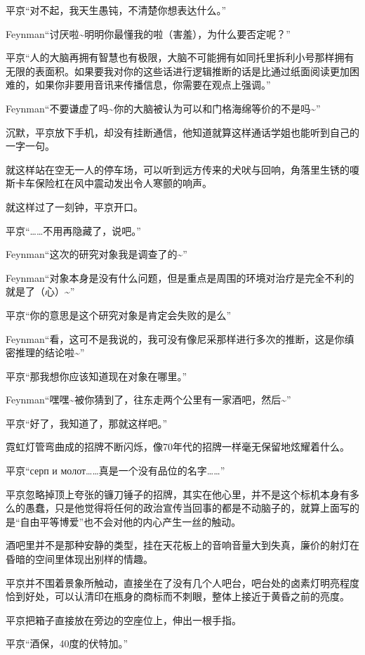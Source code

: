 \documentclass{article}
\begin{document}
平京“对不起，我天生愚钝，不清楚你想表达什么。”

Feynman“讨厌啦\textasciitilde 明明你最懂我的啦（害羞），为什么要否定呢？”

平京“人的大脑再拥有智慧也有极限，大脑不可能拥有如同托里拆利小号那样拥有无限的表面积。如果要我对你的这些话进行逻辑推断的话是比通过纸面阅读更加困难的，如果你非要用音讯来传播信息，你需要在观点上强调。”

Feynman“不要谦虚了吗\textasciitilde 你的大脑被认为可以和门格海绵等价的不是吗\textasciitilde ”

沉默，平京放下手机，却没有挂断通信，他知道就算这样通话学姐也能听到自己的一字一句。

就这样站在空无一人的停车场，可以听到远方传来的犬吠与回响，角落里生锈的嗄斯卡车保险杠在风中震动发出令人寒颤的响声。

就这样过了一刻钟，平京开口。

平京“……不用再隐藏了，说吧。”

Feynman“这次的研究对象我是调查了的\textasciitilde ”

Feynman“对象本身是没有什么问题，但是重点是周围的环境对治疗是完全不利的就是了（心）\textasciitilde ”

平京“你的意思是这个研究对象是肯定会失败的是么”

Feynman“看，这可不是我说的，我可没有像尼采那样进行多次的推断，这是你缜密推理的结论啦\textasciitilde ”

平京“那我想你应该知道现在对象在哪里。”

Feynman“嘿嘿\textasciitilde 被你猜到了，往东走两个公里有一家酒吧，然后\textasciitilde ”

平京“好了，我知道了，那就这样吧。”

霓虹灯管弯曲成的招牌不断闪烁，像70年代的招牌一样毫无保留地炫耀着什么。

平京“серп и молот……真是一个没有品位的名字……”

平京忽略掉顶上夸张的镰刀锤子的招牌，其实在他心里，并不是这个标机本身有多么的愚蠢，只是他觉得将任何的政治宣传当回事的都是不动脑子的，就算上面写的是“自由平等博爱”也不会对他的内心产生一丝的触动。

酒吧里并不是那种安静的类型，挂在天花板上的音响音量大到失真，廉价的射灯在昏暗的空间里体现出别样的情趣。

平京并不围着景象所触动，直接坐在了没有几个人吧台，吧台处的卤素灯明亮程度恰到好处，可以认清印在瓶身的商标而不刺眼，整体上接近于黄昏之前的亮度。

平京把箱子直接放在旁边的空座位上，伸出一根手指。

平京“酒保，40度的伏特加。”
\end{document}
